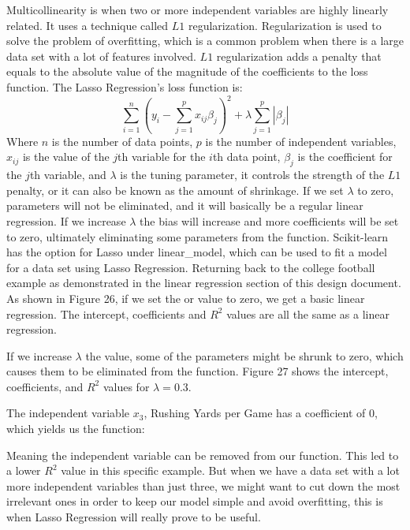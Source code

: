 \documentclass[a4paper,12pt]{report}
\begin{document}
Multicollinearity is when two or more independent variables are highly linearly related. It uses a technique called $L1$ regularization. Regularization is used to solve the problem of overfitting, which is a common problem when there is a large data set with a lot of features involved. $L1$ regularization adds a penalty that equals to the absolute value of the magnitude of the coefficients to the loss function. The Lasso Regression’s loss function is:
$$\sum_{i=1}^n\left(y_i-\sum_{j=1}^px_{ij}\beta_j\right)^2+\lambda\sum_{j=1}^p|\beta_j|$$
Where $n$ is the number of data points, $p$ is the number of independent variables, $x_{ij}$ is the value of the $j$th variable for the $i$th data point, $\beta_j$ is the coefficient for the $j$th variable, and $\lambda$ is the tuning parameter, it controls the strength of the $L1$ penalty, or it can also be known as the amount of shrinkage. If we set $\lambda$ to zero, parameters will not be eliminated, and it will basically be a regular linear regression. If we increase $\lambda$ the bias will increase and more coefficients will be set to zero, ultimately eliminating some parameters from the function. Scikit-learn has the option for Lasso under linear\_model, which can be used to fit a model for a data set using Lasso Regression. Returning back to the college football example as demonstrated in the linear regression section of this design document. As shown in Figure 26, if we set the or value to zero, we get a basic linear regression. The intercept, coefficients and $R^2$ values are all the same as a linear regression. 

If we increase $\lambda$ the value, some of the parameters might be shrunk to zero, which causes them to be eliminated from the function. Figure 27 shows the intercept, coefficients, and $R^2$ values for $\lambda=0.3$.

The independent variable $x_3$, Rushing Yards per Game has a coefficient of 0, which yields us the function:

Meaning the independent variable  can be removed from our function. This led to a lower $R^2$ value in this specific example. But when we have a data set with a lot more independent variables than just three, we might want to cut down the most irrelevant ones in order to keep our model simple and avoid overfitting, this is when Lasso Regression will really prove to be useful. 
\end{document}
